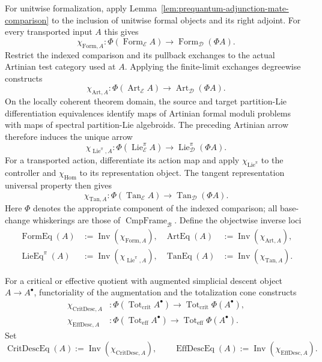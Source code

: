 \begin{construction}
\label{constr:prequantum-remaining-comparison-exchanges}
For unitwise formalization, apply
Lemma~\ref{lem:prequantum-adjunction-mate-comparison} to the inclusion of
unitwise formal objects and its right adjoint.  For every transported input $A$
this gives
\[
\chi_{\mathrm{Form},A}:
 \Phi(\operatorname{Form}_{\mathcal E}A)
 \longrightarrow
 \operatorname{Form}_{\mathcal D}(\Phi A).
\]
Restrict the indexed comparison and its pullback exchanges to the actual
Artinian test category used at $A$.  Applying the finite-limit exchanges
degreewise constructs
\[
\chi_{\mathrm{Art},A}:
 \Phi(\operatorname{Art}_{\mathcal E}A)
 \longrightarrow
 \operatorname{Art}_{\mathcal D}(\Phi A).
\]
On the locally coherent theorem domain, the source and target
partition-Lie differentiation equivalences identify maps of Artinian formal
moduli problems with maps of spectral partition-Lie algebroids.  The preceding
Artinian arrow therefore induces the unique arrow
\[
\chi_{\operatorname{Lie}^{\pi},A}:
 \Phi(\operatorname{Lie}^{\pi}_{\mathcal E}A)
 \longrightarrow
 \operatorname{Lie}^{\pi}_{\mathcal D}(\Phi A).
\]
For a transported action, differentiate its action map and apply
$\chi_{\operatorname{Lie}^{\pi}}$ to the controller and
$\chi_{\mathrm{Hom}}$ to its representation object.  The tangent
representation universal property then gives
\[
\chi_{\mathrm{Tan},A}:
 \Phi(\operatorname{Tan}_{\mathcal E}A)
 \longrightarrow
 \operatorname{Tan}_{\mathcal D}(\Phi A).
\]
Here $\Phi$ denotes the appropriate component of the indexed comparison; all
base-change whiskerings are those of
$\operatorname{CmpFrame}_{\mathcal B}$.  Define the objectwise inverse loci
\[
\boxed{
\begin{aligned}
\operatorname{FormEq}(A)&:=\operatorname{Inv}(\chi_{\mathrm{Form},A}),&
\operatorname{ArtEq}(A)&:=\operatorname{Inv}(\chi_{\mathrm{Art},A}),\\
\operatorname{LieEq}^{\pi}(A)&:=
 \operatorname{Inv}(\chi_{\operatorname{Lie}^{\pi},A}),&
\operatorname{TanEq}(A)&:=\operatorname{Inv}(\chi_{\mathrm{Tan},A}).
\end{aligned}
}
\]

For a critical or effective quotient with augmented simplicial descent object
$A\to A^\bullet$, functoriality of the augmentation and the totalization cone
constructs
\[
\begin{aligned}
\chi_{\mathrm{CritDesc},A}&:
 \Phi(\operatorname{Tot}_{\mathrm{crit}}A^\bullet)
 \longrightarrow
 \operatorname{Tot}_{\mathrm{crit}}\Phi(A^\bullet),\\
\chi_{\mathrm{EffDesc},A}&:
 \Phi(\operatorname{Tot}_{\mathrm{eff}}A^\bullet)
 \longrightarrow
 \operatorname{Tot}_{\mathrm{eff}}\Phi(A^\bullet).
\end{aligned}
\]
Set
\[
\boxed{
\operatorname{CritDescEq}(A):=
\operatorname{Inv}(\chi_{\mathrm{CritDesc},A}),
\qquad
\operatorname{EffDescEq}(A):=
\operatorname{Inv}(\chi_{\mathrm{EffDesc},A}).
}
\]


\end{construction}
